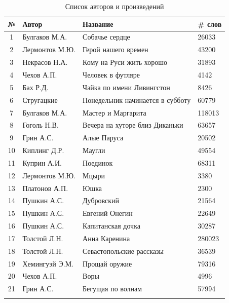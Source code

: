 \begin{longtable}{|c|l|l|l|}
    \hline
    \textbf{№} & \textbf{Автор} & \textbf{Название} & \textbf{\# слов}   \\ \hline
    1  & Булгаков М.А.    & Собачье сердце                      & 26033  \\ \hline
    2  & Лермонтов М.Ю.   & Герой нашего времен                 & 43200  \\ \hline
    3  & Некрасов Н.А.    & Кому на Руси жить хорошо            & 31893  \\ \hline
    4  & Чехов А.П.       & Человек в футляре                   & 4142   \\ \hline
    5  & Бах Р.Д.         & Чайка по имени Ливингстон           & 8426   \\ \hline
    6  & Стругацкие       & Понедельник начинается в субботу    & 60779  \\ \hline
    7  & Булгаков М.А.    & Мастер и Маргарита                  & 118013 \\ \hline
    8  & Гоголь Н.В.      & Вечера на хуторе близ Диканьки      & 63657  \\ \hline
    9  & Грин А.С.        & Алые Паруса                         & 20502  \\ \hline
    10 & Киплинг Д.Р.     & Маугли                              & 49554  \\ \hline
    11 & Куприн А.И.      & Поединок                            & 68311  \\ \hline
    12 & Лермонтов М.Ю.   & Мцыри                               & 3380   \\ \hline
    13 & Платонов А.П.    & Юшка                                & 2300   \\ \hline
    14 & Пушкин А.С.      & Дубровский                          & 21564  \\ \hline
    15 & Пушкин А.С.      & Евгений Онегин                      & 22649  \\ \hline
    16 & Пушкин А.С.      & Капитанская дочка                   & 30287  \\ \hline
    17 & Толстой Л.Н.     & Анна Каренина                       & 280023 \\ \hline
    18 & Толстой Л.Н.     & Севастопольские рассказы            & 36539  \\ \hline
    19 & Хемингуэй Э.М.   & Прощай оружие                       & 79316  \\ \hline
    20 & Чехов А.П.       & Воры                                & 4996   \\ \hline
    21 & Грин А.С.        & Бегущая по волнам                   & 57994  \\ \hline
    \caption{Список авторов и произведений}
    \label{text-data}
\end{longtable}

